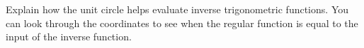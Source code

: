 {Explain how the unit circle helps evaluate inverse trigonometric functions.}
{You can look through the coordinates to see when the regular function is equal to the input of the inverse function.}
